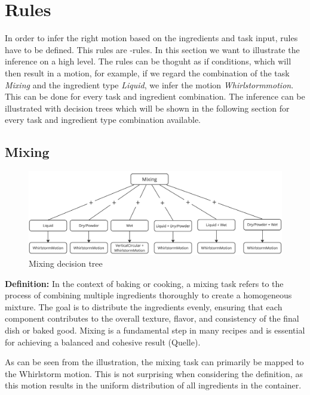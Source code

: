 \section{Rules}
In order to infer the right motion based on the ingredients and task input, rules have to be defined. This rules are -rules.
In this section we want to illustrate the inference on a high level.
The rules can be thoguht as if conditions, which will then result in a motion, 
for example, if we regard the combination of the task \textit{Mixing} and the ingredient type \textit{Liquid}, we infer the motion \textit{Whirlstormmotion}. 
This can be done for every task and ingredient combination. 
The inference can be illustrated with decision trees which will be shown in the following section for every task and ingredient type combination available. 

\subsection{Mixing}
\begin{figure}[H]
\includegraphics[scale=0.18]{Graphics/MixingDecisionTree.jpg}
\caption{Mixing decision tree}
\end{figure}
\textbf{Definition:} In the context of baking or cooking, a mixing task refers to the process of combining multiple ingredients thoroughly to create a homogeneous mixture. The goal is to distribute the ingredients evenly, ensuring that each component contributes to the overall texture, flavor, and consistency of the final dish or baked good. Mixing is a fundamental step in many recipes and is essential for achieving a balanced and cohesive result (Quelle).


As can be seen from the illustration, the mixing task can primarily be mapped to the Whirlstorm motion. This is not surprising when considering the definition, as this motion results in the uniform distribution of all ingredients in the container.
